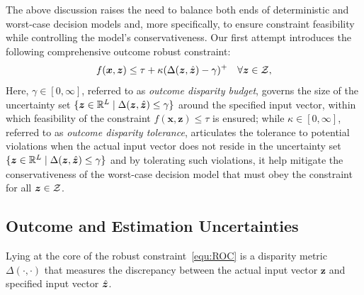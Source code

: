 \documentclass[opre, nonblindrev]{informswp}
\newcommand{\1}[1]{\mathds{1}{\left(#1\right)}}
\begin{document}
The above discussion raises the need to balance both ends of deterministic and worst-case decision models and, more specifically, to ensure constraint feasibility while controlling the model's conservativeness. Our first attempt introduces the following comprehensive outcome robust constraint:
\begin{equation}
\label{equ:ROC}
f(\bm x,\bm z) \leq \tau + \kappa (\Delta(\bm z,\hat{\bm{z}}) - \gamma)^+ ~~~\forall \bm z \in \mathcal{Z},
\end{equation}
Here, $\gamma \in [0,\infty]$, referred to as \textit{outcome disparity budget}, governs the size of the uncertainty set $\{\bm z \in \mathbb{R}^L \;|\; \Delta(\bm z, \hat{\bm{z}}) \leq \gamma\}$ around the specified input vector, within which feasibility of the constraint $f(\bm x, \bm z) \leq \tau$ is ensured; while $\kappa \in [0, \infty]$, referred to as \textit{outcome disparity tolerance}, articulates the tolerance to potential violations when the actual input vector does not reside in the uncertainty set $\{\bm z \in \mathbb{R}^L \;|\; \Delta(\bm z, \hat{\bm{z}}) \leq \gamma\}$ and by tolerating such violations, it help mitigate the conservativeness of the worst-case decision model that must obey the constraint for all $\bm z \in \mathcal{Z}$. 

\subsection*{Outcome and Estimation Uncertainties}

Lying at the core of the robust constraint~\eqref{equ:ROC} is a disparity metric $\Delta(\cdot,\cdot)$ that measures the discrepancy between the actual input vector $\bm z$ and specified input vector $\hat{\bm{z}}$. 
\end{document}

